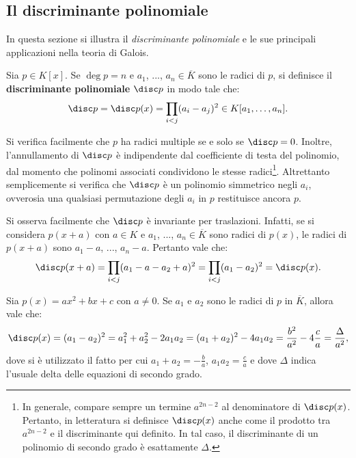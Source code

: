 \documentclass[11pt]{scrartcl}
\begin{document}
\newpage
\subsection{Il discriminante polinomiale}
In questa sezione si illustra il \textit{discriminante polinomiale} e
le sue principali applicazioni nella teoria di Galois.

\begin{definition}
	Sia $p \in K[x]$. Se $\deg p = n$ e $a_1$, ..., $a_n \in \overline{K}$ sono le radici
	di $p$, si definisce il \textbf{discriminante polinomiale} $\disc p$ in modo
	tale che:
	\[ \disc p = \disc p(x) = \prod_{i < j} (a_i - a_j)^2 \in K[a_1, \ldots, a_n]. \]
\end{definition}

Si verifica facilmente che $p$ ha radici multiple se e solo se $\disc p = 0$. Inoltre,
l'annullamento di $\disc p$ è indipendente dal coefficiente di testa del polinomio,
dal momento che polinomi associati condividono le stesse radici\footnote{
		In generale, compare sempre un termine $a^{2n-2}$ al denominatore
		di $\disc p(x)$. Pertanto, in letteratura si definisce $\disc p(x)$
		anche come il prodotto tra $a^{2n-2}$ e il discriminante qui definito.
		In tal caso, il discriminante di un polinomio di secondo grado è
		esattamente $\Delta$. 
}. Altrettanto
semplicemente si verifica che $\disc p$ è un polinomio simmetrico negli $a_i$, ovverosia
una qualsiasi permutazione degli $a_i$ in $p$ restituisce ancora $p$. \medskip


Si osserva facilmente che $\disc p$ è invariante per traslazioni. Infatti,
se si considera $p(x+a)$ con $a \in K$ e $a_1$, ..., $a_n \in \overline{K}$ sono
radici di $p(x)$, le radici di $p(x+a)$ sono $a_1 - a$, ..., $a_n - a$. Pertanto
vale che:
\[ \disc p(x+a) = \prod_{i<j} (a_1 - a - a_2 + a)^2 = \prod_{i<j} (a_1 - a_2)^2 = \disc p(x). \]

\begin{example}
	Sia $p(x) = ax^2 + bx + c$ con $a \neq 0$. Se $a_1$ e $a_2$ sono le radici di $p$ in $\overline{K}$, allora vale che:
	\[ \disc p(x) = (a_1 - a_2)^2 = a_1^2 + a_2^2 - 2 a_1 a_2 = (a_1 + a_2)^2 - 4 a_1 a_2 =
		\frac{b^2}{a^2} - 4 \frac{c}{a} = \frac{\Delta}{a^2}, \]
	dove si è utilizzato il fatto per cui $a_1 + a_2 = -\frac{b}{a}$, $a_1 a_2 = \frac{c}{a}$
	e dove $\Delta$ indica l'usuale delta delle equazioni di secondo grado.
\end{example}
\end{document}
